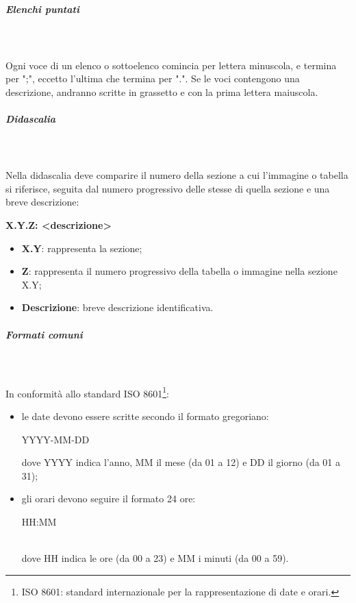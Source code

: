 \subparagraph*{Elenchi puntati}\mbox{} \\ \mbox{} \\
Ogni voce di un elenco o sottoelenco comincia per lettera minuscola, e termina per ";", eccetto l'ultima che termina per ".". 
Se le voci contengono una descrizione, andranno scritte in grassetto e con la prima lettera maiuscola.

\subparagraph*{Didascalia}\mbox{} \\ \mbox{} \\
Nella didascalia deve comparire il numero della sezione a cui l'immagine o tabella si riferisce, seguita dal numero progressivo delle stesse di quella sezione e una breve descrizione: \\
\centerline{\textbf{X.Y.Z: <descrizione>}}
\begin{itemize}
\item \textbf{X.Y}: rappresenta la sezione;
\item \textbf{Z}: rappresenta il numero progressivo della tabella o immagine nella sezione X.Y;
\item \textbf{Descrizione}: breve descrizione identificativa.
\end{itemize}

\subparagraph*{Formati comuni}\mbox{} \\ \mbox{} \\
In conformità allo standard ISO 8601\footnote{ISO 8601: standard internazionale per la rappresentazione di date e orari.}:\begin{itemize}
\item le date devono essere scritte secondo il formato gregoriano: \\
	\centerline{YYYY-MM-DD}
	dove YYYY indica l'anno, MM il mese (da 01 a 12) e DD il giorno (da 01 a 31);
\item gli orari devono seguire il formato 24 ore: \\
	\centerline{HH:MM} \\
	dove HH indica le ore (da 00 a 23) e MM i minuti (da 00 a 59).
\end{itemize} 



